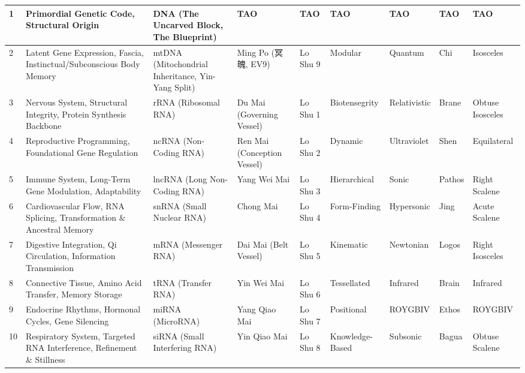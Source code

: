 \documentclass{article}
\begin{document}
\begin{landscape}
\begin{longtable}{|p{0.8cm}|p{3.2cm}|p{3.2cm}|p{3.2cm}|p{1.8cm}|p{2.4cm}|p{2.4cm}|p{1.8cm}|p{3cm}|}
1 & Primordial Genetic Code, Structural Origin & DNA (The Uncarved Block, The Blueprint) & TAO & TAO & TAO & TAO & TAO & TAO \\
\hline
2 & Latent Gene Expression, Fascia, Instinctual/Subconscious Body Memory & mtDNA (Mitochondrial Inheritance, Yin-Yang Split) & Ming Po (冥魄, EV9) & Lo Shu 9 & Modular & Quantum & Chi & Isosceles \\
\hline
3 & Nervous System, Structural Integrity, Protein Synthesis Backbone & rRNA (Ribosomal RNA) & Du Mai (Governing Vessel) & Lo Shu 1 & Biotensegrity & Relativistic & Brane & Obtuse Isosceles \\
\hline
4 & Reproductive Programming, Foundational Gene Regulation & ncRNA (Non-Coding RNA) & Ren Mai (Conception Vessel) & Lo Shu 2 & Dynamic & Ultraviolet & Shen & Equilateral \\
\hline
5 & Immune System, Long-Term Gene Modulation, Adaptability & lncRNA (Long Non-Coding RNA) & Yang Wei Mai & Lo Shu 3 & Hierarchical & Sonic & Pathos & Right Scalene \\
\hline
6 & Cardiovascular Flow, RNA Splicing, Transformation \& Ancestral Memory & snRNA (Small Nuclear RNA) & Chong Mai & Lo Shu 4 & Form-Finding & Hypersonic & Jing & Acute Scalene \\
\hline
7 & Digestive Integration, Qi Circulation, Information Transmission & mRNA (Messenger RNA) & Dai Mai (Belt Vessel) & Lo Shu 5 & Kinematic & Newtonian & Logos & Right Isosceles \\
\hline
8 & Connective Tissue, Amino Acid Transfer, Memory Storage & tRNA (Transfer RNA) & Yin Wei Mai & Lo Shu 6 & Tessellated & Infrared & Brain & Infrared \\
\hline
9 & Endocrine Rhythms, Hormonal Cycles, Gene Silencing & miRNA (MicroRNA) & Yang Qiao Mai & Lo Shu 7 & Positional & ROYGBIV & Ethos & ROYGBIV \\
\hline
10 & Respiratory System, Targeted RNA Interference, Refinement \& Stillness & siRNA (Small Interfering RNA) & Yin Qiao Mai & Lo Shu 8 & Knowledge-Based & Subsonic & Bagua & Obtuse Scalene \\
\hline

\end{longtable}

\end{landscape}
\end{document}
